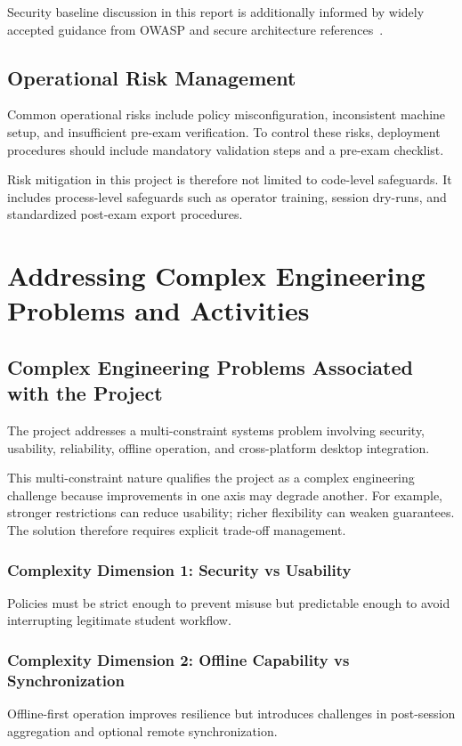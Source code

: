 \documentclass[12pt,a4paper]{report}
\begin{document}
	Security baseline discussion in this report is additionally informed by widely accepted guidance from OWASP and secure architecture references~\cite{owasp,bishop}.
	
	\section{Operational Risk Management}
	Common operational risks include policy misconfiguration, inconsistent machine setup, and insufficient pre-exam verification. To control these risks, deployment procedures should include mandatory validation steps and a pre-exam checklist.
	
	Risk mitigation in this project is therefore not limited to code-level safeguards. It includes process-level safeguards such as operator training, session dry-runs, and standardized post-exam export procedures.
	
	\chapter{Addressing Complex Engineering Problems and Activities}
	
	\section{Complex Engineering Problems Associated with the Project}
	The project addresses a multi-constraint systems problem involving security, usability, reliability, offline operation, and cross-platform desktop integration.
	
	This multi-constraint nature qualifies the project as a complex engineering challenge because improvements in one axis may degrade another. For example, stronger restrictions can reduce usability; richer flexibility can weaken guarantees. The solution therefore requires explicit trade-off management.
	
	\subsection{Complexity Dimension 1: Security vs Usability}
	Policies must be strict enough to prevent misuse but predictable enough to avoid interrupting legitimate student workflow.
	
	\subsection{Complexity Dimension 2: Offline Capability vs Synchronization}
	Offline-first operation improves resilience but introduces challenges in post-session aggregation and optional remote synchronization.
	
\end{document}

